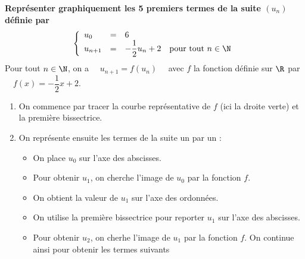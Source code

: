 \documentclass[a4paper,11pt,cours]{nsi} %
\begin{document}
\begin{methode}
    \textbf{Représenter graphiquement les 5 premiers termes de la suite $(u_n)$ définie par $$\left\{
		\begin{array}{llll}
			u_0 & = & 6 & \\
			u_{n+1} & = & -\dfrac{1}{2}u_n+2 & \text{pour tout } n\in\N\\
		\end{array}
    \right. $$}
    Pour tout $n\in\N$, on a $\quad u_{n+1}=f(u_n)\quad $ avec $f$ la fonction définie sur $\R$ par $\quad f(x)=-\dfrac{1}{2}x+2$.
    \begin{enumerate}[label=\textbullet]
        \item On commence par tracer la courbe représentative de $f$ (ici la droite verte) et la première bissectrice.
        \item On représente ensuite les termes de la suite un par un :
        \begin{itemize}
            \item On place $u_0$ sur l'axe des abscisses.
            \item Pour obtenir $u_1$, on cherche l'image de $u_0$ par la fonction $f$.
            \item On obtient la valeur de $u_1$ sur l'axe des ordonnées.
            \item On utilise la première bissectrice pour reporter $u_1$ sur l'axe des abscisses.
            \item Pour obtenir $u_2$, on cherhe l'image de $u_1$ par la fonction $f$. On continue ainsi pour obtenir les termes suivants
        \end{itemize}
    \end{enumerate}
    \begin{center}
        \def\xmin{-2} \def\ymin{-2}\def\xmax{7}\def\ymax{4}
    \end{center}
    
\end{methode}
\end{document}
